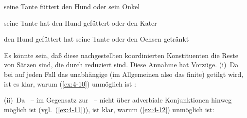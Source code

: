 \documentclass[output=paper]{langsci/langscibook}
\begin{document}
\begin{exe}
\ex
\label{ex:4-9}
\begin{xlist}
\ex%
\label{ex:4-9a}
 seine Tante füttert den Hund oder sein Onkel

\ex%
\label{ex:4-9b}
 seine Tante hat den Hund gefüttert oder den Kater

\ex%
\label{ex:4-9c}
 den Hund gefüttert hat seine Tante oder den Ochsen getränkt
\end{xlist}
\end{exe}
Es könnte sein, daß diese nachgestellten koordinierten Konstituenten die Reste von Sätzen sind, die durch  reduziert sind. Diese Annahme hat Vorzüge. (i)~Da bei  auf jeden Fall das unabhängige (im Allgemeinen also das finite)  getilgt wird, ist es klar, warum (\ref{ex:4-10}) unmöglich ist \citep[64]{Neijt1979}:


\begin{exe}
\ex
\label{ex:4-10}
\begin{xlist}
\end{xlist}
\end{exe}
(ii)~Da ~-- im Gegensatz zur ~-- nicht über adverbiale Konjunktionen hinweg möglich ist (vgl.\ (\ref{ex:4-11})), ist klar, warum (\ref{ex:4-12}) unmöglich ist:
\end{document}
